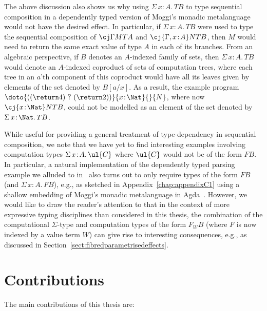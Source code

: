 The above discussion also shows us why using $\Sigma\, x \!:\! A.\, TB$ to type sequential composition in a dependently typed version of Moggi's monadic metalanguage would not have the desired effect. In particular, if $\Sigma\, x \!:\! A.\, TB$ were used to type the sequential composition of ${\cj \Gamma M TA}$ and ${\cj {\Gamma, x \!:\! A} N TB}$, then $M$ would need to return the same exact value of type $A$ in each of its branches. From an algebraic perspective, if $B$ denotes an $A$-indexed family of sets, then ${\Sigma\, x \!:\! A.\, TB}$ would denote an $A$-indexed coproduct of sets of computation trees, where each tree in an $a$'th component of this coproduct would have all its leaves given by elements of the set denoted by $B[a/x]$. 
As a result, the example program ${\doto {((\return 4) ~ ? ~ (\return 2))} {x \!:\! \Nat} {} {N}}$, where now \linebreak ${\cj {x \!:\! \Nat} N TB}$, 
could not be modelled as an element of the set denoted by $\Sigma\, x \!:\! \Nat.\, TB$. 

While useful for providing a general treatment of type-dependency in sequential composition, we note that we have yet to find interesting examples involving computation types $\Sigma\, x \!:\! A .\, \ul{C}$ where $\ul{C}$ would not be of the form $FB$. In particular, a natural implementation of the dependently typed parsing example we alluded to in~\cite{Ahman:FibredEffects} also turns out to only require types of the form $FB$ (and $\Sigma\, x \!:\! A .\, FB$), e.g., as sketched in Appendix~\ref{chap:appendixC1}  using a shallow embedding of Moggi's monadic metalanguage in Agda~\cite{Norell:Thesis}.
However, we would like to draw the reader's attention to that in the context of more expressive typing disciplines than considered in this thesis, the combination of the computational $\Sigma$-type and computation types of the form $F_W B$ (where $F$ is now indexed by a value term $W$) can give rise to interesting consequences, e.g., as discussed in Section~\ref{sect:fibredparametrisedeffects}.

\section{Contributions}
\label{sect:contributions}

The main contributions of this thesis are:

